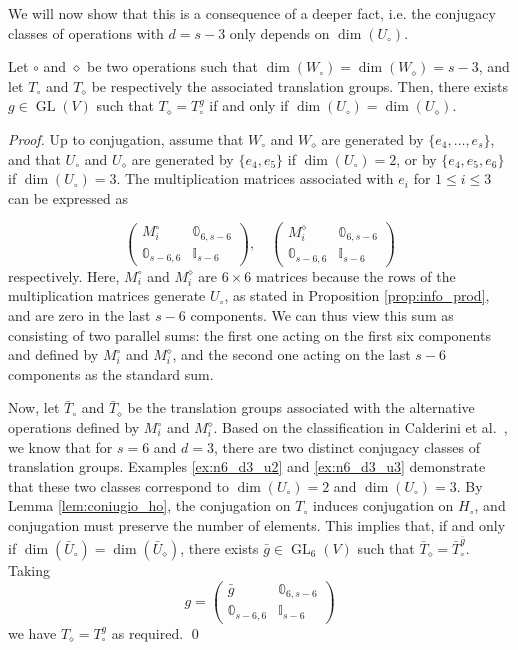 \documentclass[runningheads,a4paper,english]{llncs}
\DeclareMathOperator{\GL}{GL}
\newcommand{\wo}{W_\circ}
\newcommand{\uo}{U_\circ}
\newcommand{\ho}{H_\circ}
\begin{document}
We will now show that this is a consequence of a deeper fact, i.e. the conjugacy classes of operations with $d = s-3$ only depends on $\dim(\uo)$.
\begin{theorem}
	\label{thm:coniugio_n3}
	Let $\circ$ and $\diamond$ be two operations such that $\dim(\wo) = \dim(W_\diamond) = s-3$, and let $T_\circ$ and $T_\diamond$ be respectively the associated translation groups. Then, there exists $g \in \GL(V)$ such that $T_\diamond = T_\circ^g$ if and only if $\dim(U_\circ) = \dim(U_\diamond)$.
\end{theorem}
\begin{proof}
Up to conjugation, assume that $W_\circ$ and $W_\diamond$ are generated by $\{e_4,\dots ,e_s\}$, and that $U_\circ$ and $U_\diamond$ are generated by $\{e_4,e_5\}$ if $\dim(U_\circ) = 2$, or by $\{e_4,e_5,e_6\}$ if $\dim(U_\circ) = 3$. The multiplication matrices associated with $e_i$ for $1 \leq i \leq 3$ can be expressed as

\[
\begin{pmatrix}
M^\circ_i & \mathbb{0}_{6,s-6} \\
\mathbb{0}_{s-6,6} & \mathbb{I}_{s-6}
\end{pmatrix}, \quad
\begin{pmatrix}
M^\diamond_i & \mathbb{0}_{6,s-6} \\
\mathbb{0}_{s-6,6} & \mathbb{I}_{s-6}
\end{pmatrix}
\]
respectively. Here, $M^\circ_i$ and $M^\diamond_i$ are $6 \times 6$ matrices because the rows of the multiplication matrices generate $\uo$, as stated in Proposition \ref{prop:info_prod}, and are zero in the last $s-6$ components. We can thus view this sum as consisting of two parallel sums: the first one acting on the first six components and defined by $M^\circ_i$ and $M^\diamond_i$, and the second one acting on the last $s-6$ components as the standard sum.

Now, let $\bar{T}_\circ$ and $\bar{T}_\diamond$ be the translation groups associated with the alternative operations defined by $M^\circ_i$ and $M^\diamond_i$. Based on the classification in Calderini et al.~\cite[Table 1]{calderini2021properties}, we know that for $s=6$ and $d=3$, there are two distinct conjugacy classes of translation groups. Examples \ref{ex:n6_d3_u2} and \ref{ex:n6_d3_u3} demonstrate that these two classes correspond to $\dim(\uo) = 2$ and $\dim(\uo) = 3$. By Lemma \ref{lem:coniugio_ho}, the conjugation on $T_\circ$ induces conjugation on $\ho$, and conjugation must preserve the number of elements. This implies that, if and only if $\dim(\bar{U}_\circ) = \dim(\bar{U}_\diamond)$, there exists $\bar{g} \in \GL_6(V)$ such that $\bar{T}_\diamond = \bar{T}_\circ^{\bar{g}}$. Taking
\[
g =
\begin{pmatrix}
\bar{g} & \mathbb{0}_{6,s-6} \\
\mathbb{0}_{s-6,6} & \mathbb{I}_{s-6}
\end{pmatrix}
\]
we have $T_\diamond = T_\circ^g$ as required. \qed
\end{proof}
\end{document}

